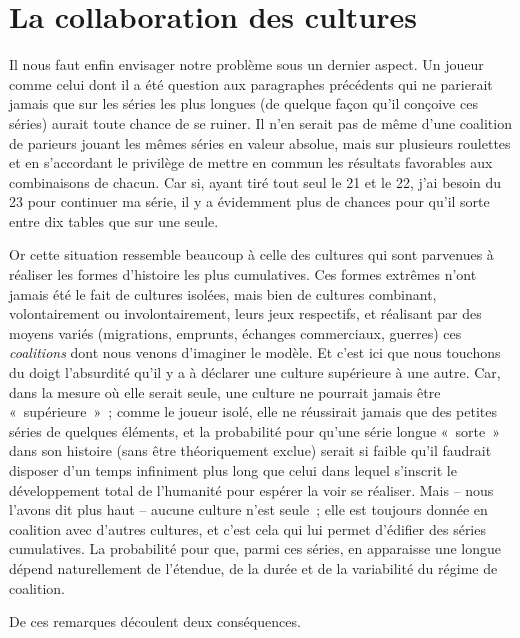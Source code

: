 \documentclass[french,twoside]{book} %
\begin{document}
\section[{La collaboration des cultures}]{La collaboration des cultures}
\renewcommand{\leftmark}{La collaboration des cultures}

\noindent Il nous faut enfin envisager notre problème sous un dernier aspect. Un joueur comme celui dont il a été question aux paragraphes précédents qui ne parierait jamais que sur les séries les plus longues (de quelque façon qu’il conçoive ces séries) aurait toute chance de se ruiner. Il n’en serait pas de même d’une coalition de parieurs jouant les mêmes séries en valeur absolue, mais sur plusieurs roulettes et en s’accordant le privilège de mettre en commun les résultats favorables aux combinaisons de chacun. Car si, ayant tiré tout seul le 21 et le 22, j’ai besoin du 23 pour continuer ma série, il y a évidemment plus de chances pour qu’il sorte entre dix tables que sur une seule.\par
Or cette situation ressemble beaucoup à celle des cultures qui sont parvenues à réaliser les formes d’histoire les plus cumulatives. Ces formes extrêmes n’ont jamais été le fait de cultures isolées, mais bien de cultures combinant, volontairement ou involontairement, leurs jeux respectifs, et réalisant par des moyens variés (migrations, emprunts, échanges commerciaux, guerres) ces \emph{coalitions} dont nous venons d’imaginer le modèle. Et c’est ici que nous touchons du doigt l’absurdité qu’il y a à déclarer une culture supérieure à une autre. Car, dans la mesure où elle serait seule, une culture ne pourrait jamais être « supérieure » ; comme le joueur isolé, elle ne réussirait jamais que des petites séries de quelques éléments, et la probabilité pour qu’une série longue « sorte » dans son histoire (sans être théoriquement exclue) serait si faible qu’il faudrait disposer d’un temps infiniment plus long que celui dans lequel s’inscrit le développement total de l’humanité pour espérer la voir se réaliser. Mais – nous l’avons dit plus haut – aucune culture n’est seule ; elle est toujours donnée en coalition avec d’autres cultures, et c’est cela qui lui permet d’édifier des séries cumulatives. La probabilité pour que, parmi ces séries, en apparaisse une longue dépend naturellement de l’étendue, de la durée et de la variabilité du régime de coalition.\par
De ces remarques découlent deux conséquences.\par
\end{document}
